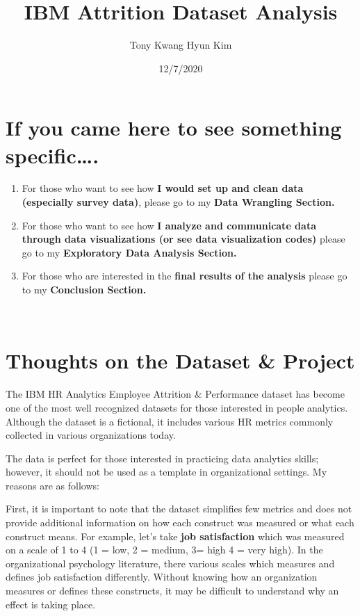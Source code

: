 \documentclass[
]{article}
\title{IBM Attrition Dataset Analysis}
\author{Tony Kwang Hyun Kim}
\date{12/7/2020}
\begin{document}
\maketitle

\hypertarget{if-you-came-here-to-see-something-specific.}{%
\section{If you came here to see something
specific\ldots.}\label{if-you-came-here-to-see-something-specific.}}

\begin{enumerate}
\def\labelenumi{\arabic{enumi}.}
\item
  For those who want to see how \textbf{I would set up and clean data
  (especially survey data)}, please go to my \textbf{Data Wrangling
  Section.}
\item
  For those who want to see how \textbf{I analyze and communicate data
  through data visualizations (or see data visualization codes) } please
  go to my \textbf{Exploratory Data Analysis Section.}
\item
  For those who are interested in the \textbf{final results of the
  analysis} please go to my \textbf{Conclusion Section.}
\end{enumerate}

~

\hypertarget{thoughts-on-the-dataset-project}{%
\section{Thoughts on the Dataset \&
Project}\label{thoughts-on-the-dataset-project}}

The IBM HR Analytics Employee Attrition \& Performance dataset has
become one of the most well recognized datasets for those interested in
people analytics. Although the dataset is a fictional, it includes
various HR metrics commonly collected in various organizations today.

The data is perfect for those interested in practicing data analytics
skills; however, it should not be used as a template in organizational
settings. My reasons are as follows:

First, it is important to note that the dataset simplifies few metrics
and does not provide additional information on how each construct was
measured or what each construct means. For example, let's take
\textbf{job satisfaction} which was measured on a scale of 1 to 4 (1 =
low, 2 = medium, 3= high 4 = very high). In the organizational
psychology literature, there various scales which measures and defines
job satisfaction differently. Without knowing how an organization
measures or defines these constructs, it may be difficult to understand
why an effect is taking place.
\end{document}
